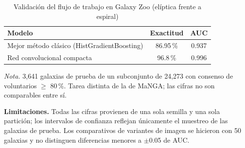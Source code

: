 \documentclass[letterpaper,11pt]{article}
\newcommand{\nota}[1]{{\footnotesize\textit{Nota.} #1\par}}
\begin{document}
\begin{table}[!ht]
\caption{Validación del flujo de trabajo en Galaxy Zoo (elíptica frente a espiral)}
\small
\centering
\begin{tabular}{@{}lcc@{}}
\toprule
Modelo & Exactitud & AUC\\
\midrule
Mejor método clásico (HistGradientBoosting) & 86.95\,\% & 0.937\\
Red convolucional compacta & 96.8\,\% & 0.996\\
\bottomrule
\end{tabular}
\nota{3,641 galaxias de prueba de un subconjunto de 24,273 con consenso de voluntarios $\geq$ 80\,\%. Tarea distinta de la de MaNGA; las cifras no son comparables entre sí.}
\end{table}

\noindent\textbf{Limitaciones.} Todas las cifras provienen de una sola semilla y una sola partición; los intervalos de confianza reflejan únicamente el muestreo de las galaxias de prueba. Los comparativos de variantes de imagen se hicieron con 50 galaxias y no distinguen diferencias menores a $\pm$0.05 de AUC.
\end{document}
